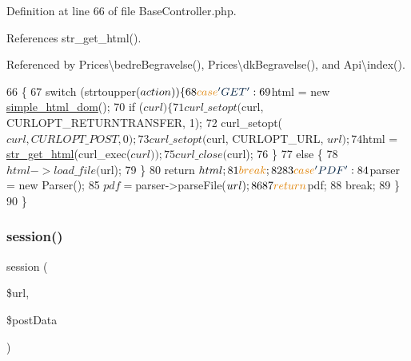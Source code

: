 Definition at line 66 of file Base\+Controller.\+php.



References str\+\_\+get\+\_\+html().



Referenced by Prices\textbackslash{}bedre\+Begravelse(), Prices\textbackslash{}dk\+Begravelse(), and Api\textbackslash{}index().


\begin{DoxyCode}
66                                                            \{
67         \textcolor{keywordflow}{switch} (strtoupper($action)) \{
68             \textcolor{keywordflow}{case} \textcolor{stringliteral}{'GET'}:
69             $html = \textcolor{keyword}{new} \hyperlink{classsimple__html__dom}{simple\_html\_dom}();
70             \textcolor{keywordflow}{if} ($curl) \{
71                 curl\_setopt($curl, CURLOPT\_RETURNTRANSFER, 1); 
72                 curl\_setopt($curl, CURLOPT\_POST, 0);
73                 curl\_setopt($curl, CURLOPT\_URL, $url);
74                 $html = \hyperlink{simple__html__dom_8php_a2a9c7626f0cb0a56eb81709124a08922}{str\_get\_html}(curl\_exec($curl));
75                 curl\_close($curl);
76             \}
77             \textcolor{keywordflow}{else} \{
78                 $html->load\_file($url);
79             \}
80             \textcolor{keywordflow}{return} $html;
81             \textcolor{keywordflow}{break};
82             
83             \textcolor{keywordflow}{case} \textcolor{stringliteral}{'PDF'}:
84             $parser = \textcolor{keyword}{new} Parser();
85             $pdf = $parser->parseFile($url);
86 
87             \textcolor{keywordflow}{return} $pdf;
88             \textcolor{keywordflow}{break};
89         \}
90     \}
\end{DoxyCode}
\hypertarget{class_base_controller_a259a554926fc05640c8c711c340cdeac}{}\label{class_base_controller_a259a554926fc05640c8c711c340cdeac} 
\subsubsection{\texorpdfstring{session()}{session()}}
{\footnotesize\ttfamily session (\begin{DoxyParamCaption}\item[{}]{\$url,  }\item[{}]{\$post\+Data }\end{DoxyParamCaption})\hspace{0.3cm}{\ttfamily [protected]}}

